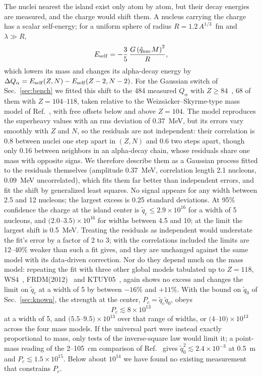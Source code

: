 \documentclass[aps,prd,onecolumn,superscriptaddress,floatfix,nofootinbib]{revtex4-2}
\newcommand{\qt}{\tilde q}
\begin{document}
The nuclei nearest the island exist only atom by atom, but their decay energies are measured, and the charge would
shift them. A nucleus carrying the charge has a scalar self-energy; for a uniform sphere of radius
$R=1.2\,A^{1/3}$~fm and $\lambda\gg R$,
\begin{equation}
E_{\rm self} = -\frac{3}{5}\,\frac{G\left(\qt_{\rm nuc}M\right)^2}{R},
\label{eq:self}
\end{equation}
which lowers its mass and changes its alpha-decay energy by
$\Delta Q_\alpha=E_{\rm self}(Z,N)-E_{\rm self}(Z-2,N-2)$. For the Gaussian switch of Sec.~\ref{sec:bench} we fitted
this shift to the 484 measured $Q_\alpha$ with $Z\ge84$~\cite{Wang2021}, 68 of them with $Z=104$--$118$, taken
relative to the Weizs\"acker--Skyrme-type mass model of Ref.~\cite{Ma2019}, with free offsets below and above
$Z=104$. The model reproduces the superheavy values with an rms deviation of 0.37~MeV, but its errors vary smoothly
with $Z$ and $N$, so the residuals are not independent: their correlation is 0.8 between nuclei one step apart in
$(Z,N)$ and 0.6 two steps apart, though only 0.16 between neighbors in an alpha-decay chain, whose residuals share
one mass with opposite signs. We therefore describe them as a Gaussian process fitted to the residuals themselves
(amplitude 0.37~MeV, correlation length 2.1 nucleons, 0.09~MeV uncorrelated), which fits them far better than
independent errors, and fit the shift by generalized least squares. No signal appears for any width between 2.5 and
12 nucleons; the largest excess is 0.25 standard deviations. At 95\% confidence the charge at the island center is
$\qt_c\le2.9\times10^{16}$ for a width of 5 nucleons, and $(2.0$--$3.5)\times10^{16}$ for widths between 4.5 and 10;
at the limit the largest shift is 0.5~MeV. Treating the residuals as independent would understate the fit's error
by a factor of 2 to 3; with the correlations included the limits are 12--40\% weaker than such a fit gives, and
they are unchanged against the same model with its data-driven correction. Nor do they depend much on the mass
model: repeating the fit with three other global models tabulated up to $Z=118$, WS4~\cite{Wang2014},
FRDM(2012)~\cite{Moller2016} and KTUY05~\cite{Koura2005}, again shows no excess and changes the limit on $\qt_c$ at
a width of 5 by between $-16\%$ and $+11\%$. With the bound on $\qt_0$ of
Sec.~\ref{sec:known}, the strength at the center, $P_c=\qt_c\qt_0$, obeys
\begin{equation}
P_c \lesssim 8\times10^{13}
\label{eq:Pcmax}
\end{equation}
at a width of 5, and $(5.5$--$9.5)\times10^{13}$ over that range of widths, or $(4$--$10)\times10^{13}$ across the
four mass models. If the universal part were instead
exactly proportional to mass, only tests of the inverse-square law would limit it; a point-mass reading of the
2--105~cm comparison of Ref.~\cite{Hoskins1985} gives $\qt_0^2\lesssim2.4\times10^{-3}$ at 0.5~m and
$P_c\lesssim1.5\times10^{15}$. Below about $10^{14}$ we have found no existing measurement that constrains $P_c$.
\end{document}
